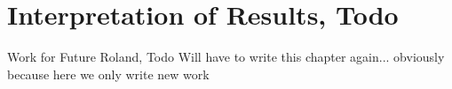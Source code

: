 \section{Interpretation of Results, Todo}
Work for Future Roland, Todo
Will have to write this chapter again... obviously because here we only write new work

